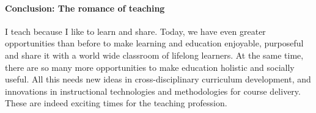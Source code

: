 \documentclass[
9pt, 
]{article}
\begin{document}
\paragraph{Conclusion: The romance of teaching}
I teach because I like to learn and share.  Today, we have
even greater opportunities than before to make learning and
education enjoyable, purposeful and share it with a world
wide classroom of lifelong learners.  At the same time,
there are so many more opportunities to make education
holistic and socially useful.  All this needs new ideas in
cross-disciplinary curriculum development, and innovations
in instructional technologies and methodologies for course
delivery.  These are indeed exciting times for the teaching
profession.










\end{document}
